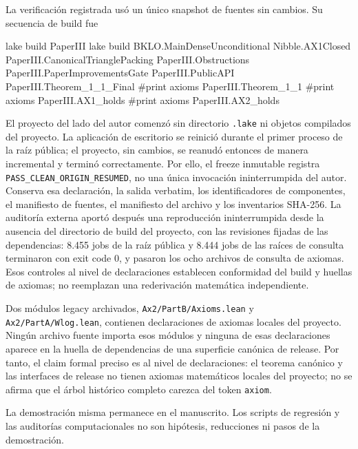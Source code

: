\documentclass[
  spanish,
  11pt,
  a4paper,
]{article}
\newenvironment{Shaded}{}{}
\newcommand{\NormalTok}[1]{#1}
\begin{document}
La verificación registrada usó un único snapshot de fuentes sin cambios. Su secuencia de build fue

\begin{Shaded}
\begin{Highlighting}[]
\NormalTok{lake build PaperIII}
\NormalTok{lake build BKLO.MainDenseUnconditional Nibble.AX1Closed PaperIII.CanonicalTrianglePacking PaperIII.Obstructions PaperIII.PaperImprovementsGate PaperIII.PublicAPI PaperIII.Theorem\_1\_1\_Final}
\NormalTok{\#print axioms PaperIII.Theorem\_1\_1}
\NormalTok{\#print axioms PaperIII.AX1\_holds}
\NormalTok{\#print axioms PaperIII.AX2\_holds}
\end{Highlighting}
\end{Shaded}

El proyecto del lado del autor comenzó sin directorio \texttt{.lake} ni objetos compilados del proyecto. La aplicación de escritorio se reinició durante el primer proceso de la raíz pública; el proyecto, sin cambios, se reanudó entonces de manera incremental y terminó correctamente. Por ello, el freeze inmutable registra \texttt{PASS\_CLEAN\_ORIGIN\_RESUMED}, no una única invocación ininterrumpida del autor. Conserva esa declaración, la salida verbatim, los identificadores de componentes, el manifiesto de fuentes, el manifiesto del archivo y los inventarios SHA-256. La auditoría externa aportó después una reproducción ininterrumpida desde la ausencia del directorio de build del proyecto, con las revisiones fijadas de las dependencias: 8.455 jobs de la raíz pública y 8.444 jobs de las raíces de consulta terminaron con exit code 0, y pasaron los ocho archivos de consulta de axiomas. Esos controles al nivel de declaraciones establecen conformidad del build y huellas de axiomas; no reemplazan una rederivación matemática independiente.

Dos módulos legacy archivados, \texttt{Ax2/PartB/Axioms.lean} y \texttt{Ax2/PartA/Wlog.lean}, contienen declaraciones de axiomas locales del proyecto. Ningún archivo fuente importa esos módulos y ninguna de esas declaraciones aparece en la huella de dependencias de una superficie canónica de release. Por tanto, el claim formal preciso es al nivel de declaraciones: el teorema canónico y las interfaces de release no tienen axiomas matemáticos locales del proyecto; no se afirma que el árbol histórico completo carezca del token \texttt{axiom}.

La demostración misma permanece en el manuscrito. Los scripts de regresión y las auditorías computacionales no son hipótesis, reducciones ni pasos de la demostración.
\end{document}
